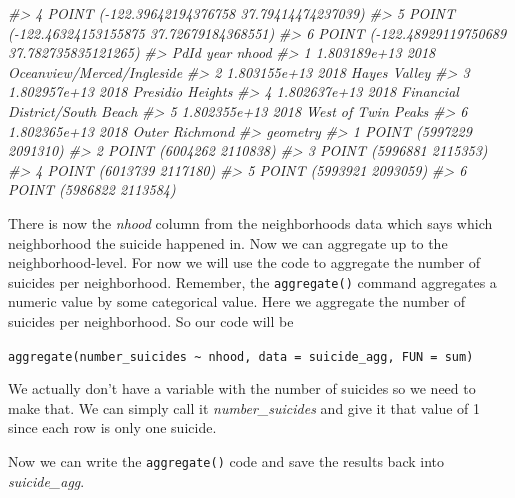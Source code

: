 \documentclass[
]{krantz}
\makeatletter
\newenvironment{Shaded}{\begin{snugshade}}{\end{snugshade}}
\newcommand{\CommentTok}[1]{\textcolor[rgb]{0.37,0.37,0.37}{\textit{#1}}}
\newcommand{\DecValTok}[1]{\textcolor[rgb]{0.06,0.06,0.06}{#1}}
\newcommand{\NormalTok}[1]{#1}
\newcommand{\OtherTok}[1]{\textcolor[rgb]{0.37,0.37,0.37}{#1}}
\newcommand{\SpecialCharTok}[1]{\textcolor[rgb]{0,0,0}{#1}}
\newenvironment{kframe}{%
\medskip{}
\setlength{\fboxsep}{.8em}
 \def\at@end@of@kframe{}%
 \ifinner\ifhmode%
  \def\at@end@of@kframe{\end{minipage}}%
  \begin{minipage}{\columnwidth}%
 \fi\fi%
 \def\FrameCommand##1{\hskip\@totalleftmargin \hskip-\fboxsep
 \colorbox{shadecolor}{##1}\hskip-\fboxsep
     \hskip-\linewidth \hskip-\@totalleftmargin \hskip\columnwidth}%
 \MakeFramed {\advance\hsize-\width
   \@totalleftmargin\z@ \linewidth\hsize
   \@setminipage}}%
 {\par\unskip\endMakeFramed%
 \at@end@of@kframe}
\renewenvironment{Shaded}{\begin{kframe}}{\end{kframe}}
\makeatother
\begin{document}
\begin{Shaded}
\begin{Highlighting}[]
\CommentTok{\#\textgreater{} 4  POINT ({-}122.39642194376758 37.79414474237039)}
\CommentTok{\#\textgreater{} 5  POINT ({-}122.46324153155875 37.72679184368551)}
\CommentTok{\#\textgreater{} 6 POINT ({-}122.48929119750689 37.782735835121265)}
\CommentTok{\#\textgreater{}           PdId year                          nhood}
\CommentTok{\#\textgreater{} 1 1.803189e+13 2018     Oceanview/Merced/Ingleside}
\CommentTok{\#\textgreater{} 2 1.803155e+13 2018                   Hayes Valley}
\CommentTok{\#\textgreater{} 3 1.802957e+13 2018               Presidio Heights}
\CommentTok{\#\textgreater{} 4 1.802637e+13 2018 Financial District/South Beach}
\CommentTok{\#\textgreater{} 5 1.802355e+13 2018             West of Twin Peaks}
\CommentTok{\#\textgreater{} 6 1.802365e+13 2018                 Outer Richmond}
\CommentTok{\#\textgreater{}                  geometry}
\CommentTok{\#\textgreater{} 1 POINT (5997229 2091310)}
\CommentTok{\#\textgreater{} 2 POINT (6004262 2110838)}
\CommentTok{\#\textgreater{} 3 POINT (5996881 2115353)}
\CommentTok{\#\textgreater{} 4 POINT (6013739 2117180)}
\CommentTok{\#\textgreater{} 5 POINT (5993921 2093059)}
\CommentTok{\#\textgreater{} 6 POINT (5986822 2113584)}
\end{Highlighting}
\end{Shaded}

There is now the \emph{nhood} column from the neighborhoods data which says which neighborhood the suicide happened in. Now we can aggregate up to the neighborhood-level.
For now we will use the code to aggregate the number of suicides per neighborhood. Remember, the \texttt{aggregate()} command aggregates a numeric value by some categorical value. Here we aggregate the number of suicides per neighborhood. So our code will be

\texttt{aggregate(number\_suicides\ \textasciitilde{}\ nhood,\ data\ =\ suicide\_agg,\ FUN\ =\ sum)}

We actually don't have a variable with the number of suicides so we need to make that. We can simply call it \emph{number\_suicides} and give it that value of 1 since each row is only one suicide.

\begin{Shaded}
\end{Shaded}

Now we can write the \texttt{aggregate()} code and save the results back into \emph{suicide\_agg}.
\end{document}
